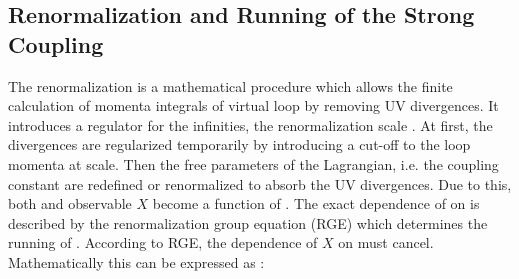 \subsection{Renormalization and Running of the Strong Coupling}
The renormalization is a mathematical procedure which allows the finite calculation of momenta integrals of virtual loop by removing UV divergences. It introduces a regulator for the infinities, the renormalization scale \mur. At first, the divergences are regularized temporarily by introducing a cut-off to the loop momenta at \mur scale. Then the free parameters of the Lagrangian, i.e. the coupling constant are redefined or renormalized to absorb the UV divergences. Due to this, both \alpsq and observable $X$ become a function of \mur. The exact dependence of \alpsmusq on \mur is described by the renormalization group equation (RGE) \cite{Callan:1970yg} which determines the running of \alpsmusq. According to RGE, the dependence of $X$ on \mur must cancel. Mathematically this can be expressed as :
 
